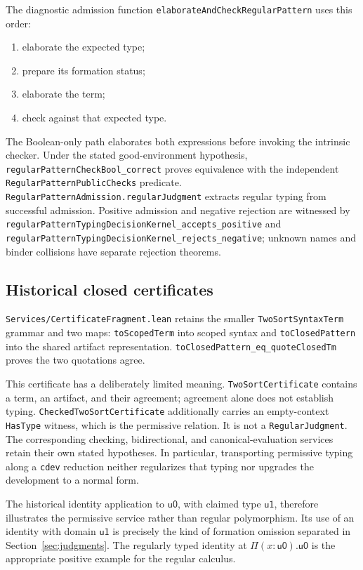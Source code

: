 \documentclass[11pt]{article}
\newcommand{\code}[1]{\nolinkurl{#1}}
\newcommand{\uZ}{\mathsf{u0}}
\newcommand{\uO}{\mathsf{u1}}
\begin{document}
The diagnostic admission function
\code{elaborateAndCheckRegularPattern} uses this order:
\begin{enumerate}[nosep]
  \item elaborate the expected type;
  \item prepare its formation status;
  \item elaborate the term;
  \item check against that expected type.
\end{enumerate}
The Boolean-only path elaborates both expressions before invoking the
intrinsic checker. Under the stated good-environment hypothesis,
\code{regularPatternCheckBool_correct} proves equivalence with the
independent \code{RegularPatternPublicChecks} predicate.
\code{RegularPatternAdmission.regularJudgment} extracts regular typing from
successful admission. Positive admission and negative rejection are
witnessed by \code{regularPatternTypingDecisionKernel_accepts_positive}
and \code{regularPatternTypingDecisionKernel_rejects_negative};
unknown names and binder collisions have separate rejection theorems.

\subsection{Historical closed certificates}

\code{Services/CertificateFragment.lean} retains the smaller
\code{TwoSortSyntaxTerm} grammar and two maps:
\code{toScopedTerm} into scoped syntax and \code{toClosedPattern} into the
shared artifact representation.
\code{toClosedPattern_eq_quoteClosedTm} proves the two quotations agree.

This certificate has a deliberately limited meaning.
\code{TwoSortCertificate} contains a term, an artifact, and their agreement;
agreement alone does not establish typing.
\code{CheckedTwoSortCertificate} additionally carries an empty-context
\code{HasType} witness, which is the permissive relation.
It is not a \code{RegularJudgment}.
The corresponding checking, bidirectional, and canonical-evaluation
services retain their own stated hypotheses.
In particular, transporting permissive typing along a \code{cdev} reduction
neither regularizes that typing nor upgrades the development to a normal form.

The historical identity application to $\uZ$, with claimed type $\uO$,
therefore illustrates the permissive service rather than regular
polymorphism. Its use of an identity with domain $\uO$ is precisely the
kind of formation omission separated in Section~\ref{sec:judgments}.
The regularly typed identity at $\Pi(x:\uZ).\uZ$ is the appropriate positive
example for the regular calculus.
\end{document}
